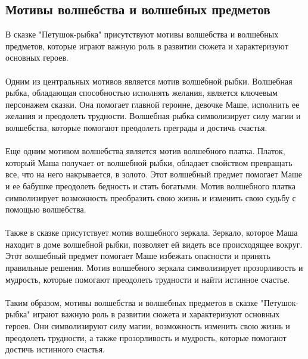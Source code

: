 \documentclass{article}
\begin{document}
\subsection{Мотивы волшебства и волшебных предметов}
В сказке "{}{}Петушок-рыбка"{}{} присутствуют мотивы волшебства и волшебных предметов, которые играют важную роль в развитии сюжета и характеризуют основных героев.\\
~\\
Одним из центральных мотивов является мотив волшебной рыбки. Волшебная рыбка, обладающая способностью исполнять желания, является ключевым персонажем сказки. Она помогает главной героине, девочке Маше, исполнить ее желания и преодолеть трудности. Волшебная рыбка символизирует силу магии и волшебства, которые помогают преодолеть преграды и достичь счастья.\\
~\\
Еще одним мотивом волшебства является мотив волшебного платка. Платок, который Маша получает от волшебной рыбки, обладает свойством превращать все, что на него накрывается, в золото. Этот волшебный предмет помогает Маше и ее бабушке преодолеть бедность и стать богатыми. Мотив волшебного платка символизирует возможность преобразить свою жизнь и изменить свою судьбу с помощью волшебства.\\
~\\
Также в сказке присутствует мотив волшебного зеркала. Зеркало, которое Маша находит в доме волшебной рыбки, позволяет ей видеть все происходящее вокруг. Этот волшебный предмет помогает Маше избежать опасности и принять правильные решения. Мотив волшебного зеркала символизирует прозорливость и мудрость, которые помогают преодолеть трудности и найти истинное счастье.\\
~\\
Таким образом, мотивы волшебства и волшебных предметов в сказке "{}{}Петушок-рыбка"{}{} играют важную роль в развитии сюжета и характеризуют основных героев. Они символизируют силу магии, возможность изменить свою жизнь и преодолеть трудности, а также прозорливость и мудрость, которые помогают достичь истинного счастья.\\
~\\

\newpage
\end{document}

